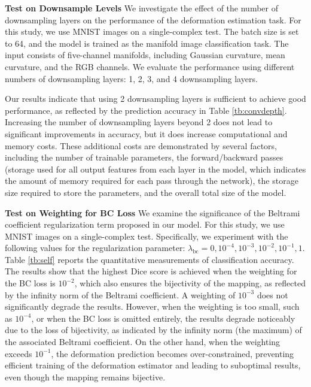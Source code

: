 

\noindent\textbf{Test on Downsample Levels} We investigate the effect of the number of downsampling layers on the performance of the deformation estimation task. For this study, we use MNIST images on a single-complex test. The batch size is set to 64, and the model is trained as the manifold image classification task. The input consists of five-channel manifolds, including Gaussian curvature, mean curvature, and the RGB channels. We evaluate the performance using different numbers of downsampling layers: 1, 2, 3, and 4 downsampling layers.

Our results indicate that using 2 downsampling layers is sufficient to achieve good performance, as reflected by the prediction accuracy in Table \ref{tb:convdepth}. Increasing the number of downsampling layers beyond 2 does not lead to significant improvements in accuracy, but it does increase computational and memory costs. These additional costs are demonstrated by several factors, including the number of trainable parameters, the forward/backward passes (storage used for all output features from each layer in the model, which indicates the amount of memory required for each pass through the network), the storage size required to store the parameters, and the overall total size of the model.


\medskip

\noindent\textbf{Test on Weighting for BC Loss} We examine the significance of the Beltrami coefficient regularization term proposed in our model. For this study, we use MNIST images on a single-complex test. Specifically, we experiment with the following values for the regularization parameter: \(\lambda_\text{bc} = 0, 10^{-4}, 10^{-3}, 10^{-2}, 10^{-1}, 1\). Table \ref{tb:self} reports the quantitative measurements of classification accuracy. The results show that the highest Dice score is achieved when the weighting for the BC loss is \(10^{-2}\), which also ensures the bijectivity of the mapping, as reflected by the infinity norm of the Beltrami coefficient. A weighting of \(10^{-3}\) does not significantly degrade the results. However, when the weighting is too small, such as \(10^{-4}\), or when the BC loss is omitted entirely, the results degrade noticeably due to the loss of bijectivity, as indicated by the infinity norm (the maximum) of the associated Beltrami coefficient. On the other hand, when the weighting exceeds \(10^{-1}\), the deformation prediction becomes over-constrained, preventing efficient training of the deformation estimator and leading to suboptimal results, even though the mapping remains bijective.